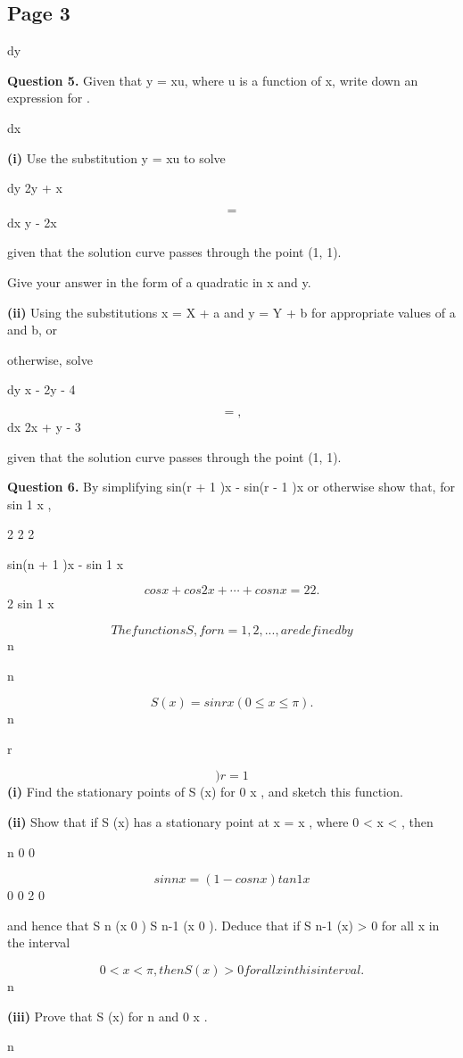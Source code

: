 \documentclass[12pt]{article}
\begin{document}
\subsection*{Page 3}
\begin{flushleft}
dy\par
\bigskip\textbf{Question 5.} Given that y = xu, where u is a function of x, write down an expression for .\par
dx\par
\textbf{(i)} Use the substitution y = xu to solve\par
dy 2y + x\par
\[=\]
dx y - 2x\par
given that the solution curve passes through the point (1, 1).\par
Give your answer in the form of a quadratic in x and y.\par
\textbf{(ii)} Using the substitutions x = X + a and y = Y + b for appropriate values of a and b, or\par
otherwise, solve\par
dy x - 2y - 4\par
\[= ,\]
dx 2x + y - 3\par
given that the solution curve passes through the point (1, 1).\par
\bigskip\textbf{Question 6.} By simplifying sin(r + 1 )x - sin(r - 1 )x or otherwise show that, for sin 1 x ,\par
2 2 2\par
sin(n + 1 )x - sin 1 x\par
\[cos x + cos 2x + \cdots + cos nx = 2 2 .\]
2 sin 1 x\par
\[The functions S , for n = 1, 2, . . . , are defined by\]
n\par
n\par
\[S (x) = sin rx (0 \leq x \leq \pi).\]
n\par
r\par
\[)r=1\]
\textbf{(i)} Find the stationary points of S (x) for 0 \leq x \leq \pi, and sketch this function.\par
\textbf{(ii)} Show that if S (x) has a stationary point at x = x , where 0 < x < \pi, then\par
n 0 0\par
\[sin nx = (1 - cos nx ) tan 1 x\]
0 0 2 0\par
and hence that S n (x 0 ) \geq S n-1 (x 0 ). Deduce that if S n-1 (x) > 0 for all x in the interval\par
\[0 < x < \pi, then S (x) > 0 for all x in this interval.\]
n\par
\textbf{(iii)} Prove that S (x)  for n  and 0 \leq x \leq \pi.\par
n\par
\end{flushleft}
\end{document}
